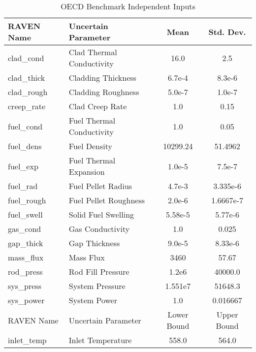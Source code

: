 \begin{table}[htb]
  \centering
  \begin{tabular}{l l|c c}\hline
    RAVEN Name & Uncertain Parameter & Mean & Std. Dev. \\ \hline
clad\_cond  & Clad Thermal Conductivity & 16.0     &     2.5 \\
clad\_thick & Cladding Thickness        & 6.7e-4   &     8.3e-6 \\
clad\_rough & Cladding Roughness        & 5.0e-7   &     1.0e-7 \\
creep\_rate & Clad Creep Rate           & 1.0      &     0.15 \\
fuel\_cond  & Fuel Thermal Conductivity & 1.0      &     0.05 \\
fuel\_dens  & Fuel Density              & 10299.24 &    51.4962 \\
fuel\_exp   & Fuel Thermal Expansion    & 1.0e-5   &     7.5e-7 \\
fuel\_rad   & Fuel Pellet Radius        & 4.7e-3   &     3.335e-6 \\
fuel\_rough & Fuel Pellet Roughness     & 2.0e-6   &     1.6667e-7 \\
fuel\_swell & Solid Fuel Swelling       & 5.58e-5  &     5.77e-6 \\
gas\_cond   & Gas Conductivity          & 1.0      &     0.025 \\
gap\_thick  & Gap Thickness             & 9.0e-5   &     8.33e-6 \\
mass\_flux  & Mass Flux                 & 3460     &    57.67 \\
rod\_press  & Rod Fill Pressure         & 1.2e6    & 40000.0 \\
sys\_press  & System Pressure           & 1.551e7  & 51648.3 \\
sys\_power  & System Power              & 1.0      &     0.016667 \\ \hline
    RAVEN Name & Uncertain Parameter & Lower Bound & Upper Bound \\ \hline
inlet\_temp & Inlet Temperature         & 558.0    & 564.0
  \end{tabular}
  \caption{OECD Benchmark Independent Inputs}
  \label{tab:oecd inputs}
\end{table}

